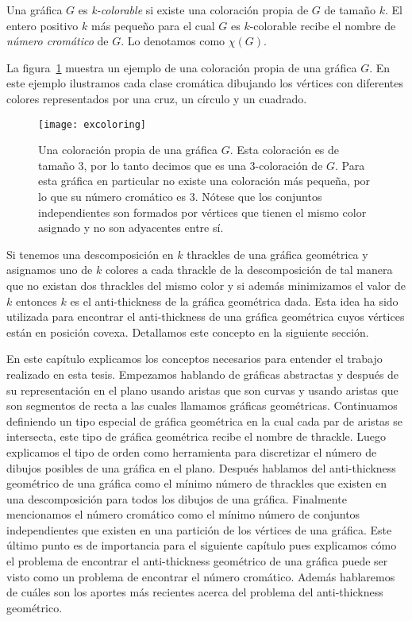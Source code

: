 Una gráfica $G$ es \emph{k-colorable} si existe una coloración propia de $G$ de
tamaño $k$. El entero positivo $k$ más pequeño para el cual $G$ es
$k$-colorable recibe el nombre de \emph{número cromático} de $G$. Lo denotamos
como $\chi(G)$.


La figura~\ref{fig:excoloring} muestra un ejemplo de una coloración propia de
una gráfica $G$. En este ejemplo ilustramos cada clase cromática dibujando los
vértices con diferentes colores representados por una cruz, un círculo y un
cuadrado.
\begin{figure}[htpb]
  \centering
  \texttt{[image: excoloring]}
  \caption{Una coloración propia de una gráfica $G$. Esta coloración es de
  tamaño 3, por lo tanto decimos que es una 3-coloración de $G$. Para esta
  gráfica en particular no existe una coloración más pequeña, por lo que su
  número cromático es 3. Nótese que los conjuntos independientes son formados
  por vértices que tienen el mismo color asignado y no son adyacentes entre sí.}
  \label{fig:excoloring}
\end{figure}
Si tenemos una descomposición en $k$ thrackles de una gráfica geométrica y
asignamos uno de $k$ colores a cada thrackle de la descomposición de tal
manera que no existan dos thrackles del mismo color y si además minimizamos
el valor de $k$ entonces $k$ es el anti-thickness de la gráfica geométrica dada.
Esta idea ha sido utilizada para encontrar el anti-thickness de una gráfica
geométrica cuyos vértices están en posición covexa. Detallamos este concepto en
la siguiente sección.

En este capítulo explicamos los conceptos necesarios para entender el trabajo
realizado en esta tesis. Empezamos hablando de gráficas abstractas y después de
su representación en el plano usando aristas que son curvas y usando aristas
que son segmentos de recta a las cuales llamamos gráficas geométricas.
Continuamos definiendo un tipo especial de gráfica geométrica en la cual cada
par de aristas se intersecta, este tipo de gráfica geométrica recibe el nombre
de thrackle. Luego explicamos el tipo de orden como herramienta para
discretizar el número de dibujos posibles de una gráfica en el plano.
Después hablamos del anti-thickness geométrico de una gráfica como el mínimo
número de thrackles que existen en una descomposición para todos los dibujos de
una gráfica. Finalmente mencionamos el número cromático como el mínimo número
de conjuntos independientes que existen en una partición de los vértices de una
gráfica. Este último punto es de importancia para el siguiente capítulo pues
explicamos cómo el problema de encontrar el anti-thickness geométrico de una
gráfica puede ser visto como un problema de encontrar el número cromático.
Además hablaremos de cuáles son los aportes más recientes acerca del problema
del anti-thickness geométrico.
